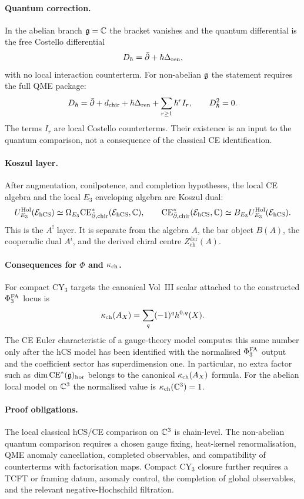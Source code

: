 \paragraph{Quantum correction.}
In the abelian branch $\mathfrak{g}=\mathbb{C}$ the bracket vanishes and the quantum
differential is the free Costello differential
\[
  D_\hbar=\bar\partial+\hbar\Delta_{\mathrm{ren}},
\]
with no local interaction counterterm.  For non-abelian $\mathfrak{g}$ the statement
requires the full QME package:
\[
  D_\hbar
  =
  \bar\partial+d_{\mathrm{chir}}
  +\hbar\Delta_{\mathrm{ren}}
  +\sum_{r\geq 1}\hbar^r I_r,
  \qquad
  D_\hbar^2=0.
\]
The terms $I_r$ are local Costello counterterms.  Their existence is an
input to the quantum comparison, not a consequence of the classical CE
identification.

\paragraph{Koszul layer.}
After augmentation, conilpotence, and completion hypotheses, the local
CE algebra and the local $E_3$ enveloping algebra are Koszul dual:
\[
  U^{\mathrm{Hol}}_{E_3}(\mathcal{E}_{\mathrm{hCS}})
  \simeq
  \Omega_{E_3}
  \mathrm{CE}^*_{\bar\partial,\mathrm{chir}}(\mathcal{E}_{\mathrm{hCS}},\mathbb{C}),
  \qquad
  \mathrm{CE}^*_{\bar\partial,\mathrm{chir}}(\mathcal{E}_{\mathrm{hCS}},\mathbb{C})
  \simeq
  B_{E_3}U^{\mathrm{Hol}}_{E_3}(\mathcal{E}_{\mathrm{hCS}}).
\]
This is the $A^!$ layer.  It is separate from the algebra $A$, the bar
object $B(A)$, the cooperadic dual $A^i$, and the derived chiral centre
$Z^{\mathrm{der}}_{\mathrm{ch}}(A)$.

\paragraph{Consequences for $\Phi$ and $\kappa_{\mathrm{ch}}$.}
For compact CY$_3$ targets the canonical Vol~III scalar attached to the
constructed $\Phi^{\mathrm{FA}}_3$ locus is
\[
  \kappa_{\mathrm{ch}}(A_X)=\sum_q(-1)^q h^{0,q}(X).
\]
The CE Euler characteristic of a gauge-theory model computes this same
number only after the hCS model has been identified with the normalised
$\Phi^{\mathrm{FA}}_3$ output and the coefficient sector has superdimension one.  In
particular, no extra factor such as
$\dim \mathrm{CE}^*(\mathfrak{g})_{\mathrm{hor}}$ belongs to the canonical
$\kappa_{\mathrm{ch}}(A_X)$ formula.  For the abelian local model on $\mathbb{C}^3$ the
normalised value is $\kappa_{\mathrm{ch}}(\mathbb{C}^3)=1$.

\paragraph{Proof obligations.}
The local classical hCS/CE comparison on $\mathbb{C}^3$ is chain-level.  The
non-abelian quantum comparison requires a chosen gauge fixing, heat-kernel
renormalisation, QME anomaly cancellation, completed observables, and
compatibility of counterterms with factorisation maps.  Compact CY$_3$
closure further requires a TCFT or framing datum, anomaly control, the
completion of global observables, and the relevant negative-Hochschild
filtration.

